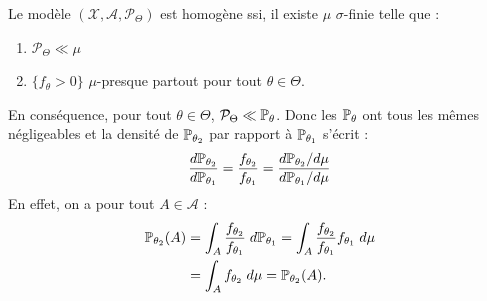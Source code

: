 \begin{proposition}
    Le modèle $( \mathcal{X}, \mathcal{A}, \mathcal{P}_\Theta)$ est homogène ssi, il existe $ \mu$ 
    $ \sigma$-finie telle que : 
    \begin{enumerate}[label=\roman*)]
        \item $ \mathcal{P}_\Theta \ll \mu$ 
        \item $\{f_\theta > 0\}$ $ \mu$-presque partout pour tout $ \theta \in \Theta$. 
    \end{enumerate}
\end{proposition}

En conséquence, pour tout $ \theta \in \Theta$, $ \mathcal{P}_\Theta \ll \mathbb{P}_\theta$. Donc 
les $ \mathbb{P}_\theta$ ont tous les mêmes négligeables et la densité de $ \mathbb{P}_{ \theta_2}$ par rapport 
à $ \mathbb{P}_{ \theta_1}$ s'écrit : 
    $$ 
        \frac{ d \mathbb{P}_{ \theta_2}}{ d \mathbb{P}_{ \theta_1}} = \frac{ f_{ \theta_2}}{f_{ \theta_1}} 
        = \frac{ d \mathbb{P}_{ \theta_2} / d \mu}{ d \mathbb{P}_{ \theta_1} / d \mu}
    $$ 
En effet, on a pour tout $A \in \mathcal{A}$ : 
    \begin{align*}
        \mathbb{P}_{ \theta_2}(A) &= \int_A \frac{f_{ \theta_2}}{f_{ \theta_1}} \; d \mathbb{P}_{ \theta_1} 
        = \int_A \frac{f_{ \theta_2}}{f_{ \theta_1}} f_{ \theta_1} \; d \mu \\ 
        &= \int_A f_{ \theta_2} \; d \mu = \mathbb{P}_{\theta_2}(A). 
    \end{align*}

